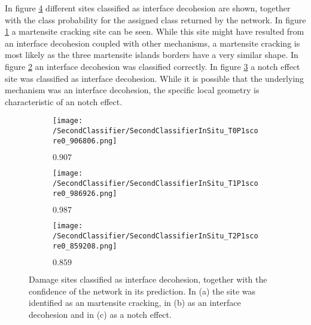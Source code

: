 In figure \ref{fig:InSituInterfaceDecohesionSamples} different sites classified as interface decohesion are shown, together with the class probability for the assigned class returned by the network. In figure \ref{sub:InSituInterfaceDecohesionSamplesM} a martensite cracking site can be seen. While this site might have resulted from an interface decohesion coupled with other mechanisms, a martensite cracking is most likely as the three martensite islands borders have a very similar shape. In figure \ref{sub:InSituInterfaceDecohesionSamplesID} an interface decohesion was classified correctly. In figure \ref{sub:InSituInterfaceDecohesionSamplesN} a notch effect site was classified as interface decohesion. While it is possible that the underlying mechanism was an interface decohesion, the specific local geometry is characteristic of an notch effect.

\begin{figure}[H]
\centering
\begin{subfigure}{0.3\textwidth}
\texttt{[image: /SecondClassifier/SecondClassifierInSitu\_T0P1score0\_906806.png]}
\caption{$0.907$}
\label{sub:InSituInterfaceDecohesionSamplesM}
\end{subfigure}
\begin{subfigure}{0.3\textwidth}
\texttt{[image: /SecondClassifier/SecondClassifierInSitu\_T1P1score0\_986926.png]}
\caption{$0.987$}
\label{sub:InSituInterfaceDecohesionSamplesID}
\end{subfigure}
\begin{subfigure}{0.3\textwidth}
\texttt{[image: /SecondClassifier/SecondClassifierInSitu\_T2P1score0\_859208.png]}
\caption{$0.859$}
\label{sub:InSituInterfaceDecohesionSamplesN}
\end{subfigure}
\caption{Damage sites classified as interface decohesion, together with the confidence of the network in its prediction. In (a) the site was identified as an martensite cracking, in (b) as an interface decohesion and in (c) as a notch effect. }
\label{fig:InSituInterfaceDecohesionSamples}
\end{figure}

